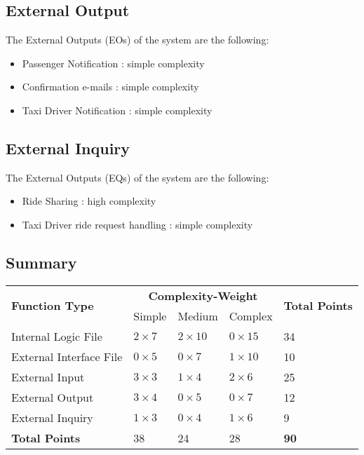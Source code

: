 \subsection{External Output}

The External Outputs (EOs) of the system are the following:

\begin{itemize}
	
	\item Passenger Notification : simple complexity
	\item Confirmation e-mails : simple complexity
	\item Taxi Driver Notification : simple complexity
	
\end{itemize}

\subsection{External Inquiry}

The External Outputs (EQs) of the system are the following:

\begin{itemize}
	
	\item Ride Sharing : high complexity
	\item Taxi Driver ride request handling : simple complexity
	
\end{itemize}

\subsection{Summary}

\begin{table}[h]
	\centering
	\begin{tabular}{| l | l | l | l | l |}
		\hline
		\multirow{2}{*}{\textbf{Function Type}} & \multicolumn{3}{c|}{\textbf{Complexity-Weight}} & \multirow{2}{*}{\textbf{Total Points}} \\
		\cline{2-4}
		& Simple & Medium & Complex & \\
		\hline
		Internal Logic File & $ 2 \times 7  $ &  $ 2 \times 10  $ &  $ 0 \times 15  $  & 34 \\ \hline
		External Interface File & $ 0 \times 5  $ & $ 0 \times 7  $ & $ 1 \times 10  $ & 10 \\ \hline
		External Input & $ 3 \times 3  $ & $ 1 \times 4  $ & $ 2 \times 6  $ & 25 \\ \hline
		External Output & $ 3 \times 4  $ & $ 0 \times 5  $ & $ 0 \times 7  $ & 12 \\ \hline
		External Inquiry & $ 1 \times 3  $ & $ 0 \times 4  $ & $ 1 \times 6  $ & 9 \\ \hline	
		\textbf{Total Points} & 38 & 24 & 28 & \textbf{90} \\
		\hline
	\end{tabular}
\end{table}